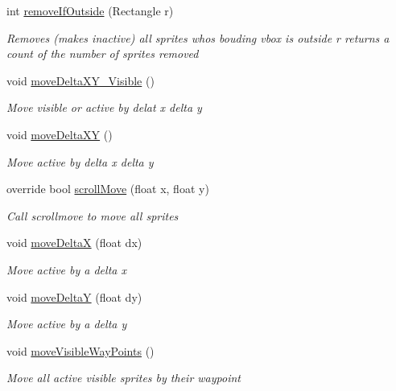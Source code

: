 \begin{DoxyCompactItemize}
int \mbox{\hyperlink{class_r_c___framework_1_1_sprite_list_a993e1c122878810e0e4cb439bc34be45}{remove\+If\+Outside}} (Rectangle r)
\begin{DoxyCompactList}\small\item\em Removes (makes inactive) all sprites whos bouding vbox is outside r returns a count of the number of sprites removed \end{DoxyCompactList}\item 
void \mbox{\hyperlink{class_r_c___framework_1_1_sprite_list_a61d8b26102baae989a9a9c82b1242c0c}{move\+Delta\+X\+Y\+\_\+\+Visible}} ()
\begin{DoxyCompactList}\small\item\em Move visible or active by delat x delta y \end{DoxyCompactList}\item 
void \mbox{\hyperlink{class_r_c___framework_1_1_sprite_list_a7412f51e494ab844da5c81c24d1b24a9}{move\+Delta\+XY}} ()
\begin{DoxyCompactList}\small\item\em Move active by delta x delta y \end{DoxyCompactList}\item 
override bool \mbox{\hyperlink{class_r_c___framework_1_1_sprite_list_ac4dbeb822b300bdcbebeb20c15b7bc9a}{scroll\+Move}} (float x, float y)
\begin{DoxyCompactList}\small\item\em Call scrollmove to move all sprites \end{DoxyCompactList}\item 
void \mbox{\hyperlink{class_r_c___framework_1_1_sprite_list_ab65f3d6bc7574e4b5df5c36b09d4d0b7}{move\+DeltaX}} (float dx)
\begin{DoxyCompactList}\small\item\em Move active by a delta x \end{DoxyCompactList}\item 
void \mbox{\hyperlink{class_r_c___framework_1_1_sprite_list_a49e91f6101d88d31069bb76d76efe9af}{move\+DeltaY}} (float dy)
\begin{DoxyCompactList}\small\item\em Move active by a delta y \end{DoxyCompactList}\item 
void \mbox{\hyperlink{class_r_c___framework_1_1_sprite_list_a2f4c60ffbdb1ed918079bb2572b0dcf5}{move\+Visible\+Way\+Points}} ()
\begin{DoxyCompactList}\small\item\em Move all active visible sprites by their waypoint \end{DoxyCompactList}\item 

\end{DoxyCompactItemize}
